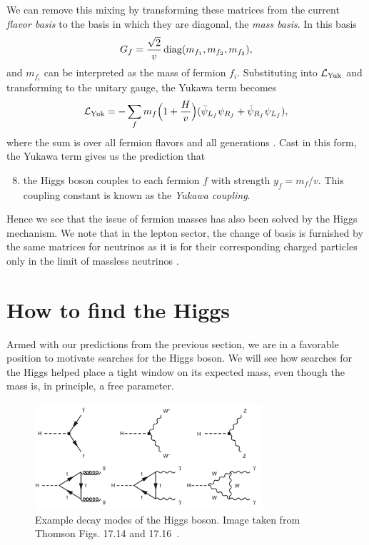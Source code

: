 We can remove this mixing by transforming these matrices from the current 
{\it flavor basis} to the basis in which they are diagonal, the {\it mass 
basis}. In this basis
\begin{equation}
  G_f=\frac{\sqrt{2}}{v}\mathop{\mathrm{diag}}(m_{f_1},m_{f_2},m_{f_3}), 
\end{equation}
and $m_{f_i}$ can be interpreted as the mass of fermion $f_i$. Substituting
 into $\mathcal{L}_{\rm Yuk}$ and transforming to the 
unitary gauge, the Yukawa term becomes
\begin{equation}
  \mathcal{L}_{\rm Yuk}=-\sum\limits_{f}m_{f}\Big(1+\frac{H}{v}\Big)
            (\bar{\psi}_{L_f}\psi_{R_f}+\bar{\psi}_{R_f}\psi_{L_f}),
\end{equation} 
where the sum is over all fermion flavors and all generations 
\cite{dittmaier_higgs_2013}. Cast
in this form, the Yukawa term gives us the prediction that
\begin{enumerate}
  \setcounter{enumi}{7}
  \item the Higgs boson couples to each fermion $f$ with strength $y_f=m_f/v$.
        This coupling constant is known as the {\it Yukawa coupling}.
\end{enumerate}
Hence we see that the issue of fermion masses has also been solved by the
Higgs mechanism. We note that in the lepton sector, the
change of basis is furnished by the same matrices for neutrinos as it is for
their corresponding charged particles only in the limit of massless neutrinos
\cite{dittmaier_higgs_2013}.


\section{How to find the Higgs}
Armed with our predictions from the previous section, we are in a favorable
position to motivate searches for the Higgs boson. We will see how searches for
the Higgs helped place a tight window on its expected mass, even though the 
mass is, in principle, a free parameter.
\begin{figure}
  \centering
  \includegraphics[width=0.75\textwidth,height=0.75\textheight,keepaspectratio]
                {pictures/higgs_decays.png}
  \caption{Example decay modes of the Higgs boson. Image taken from Thomson
           Figs. 17.14 and 17.16~\cite{thomson_modern_2013}.}
  \label{fig:exhiggsdecays}
\end{figure}

